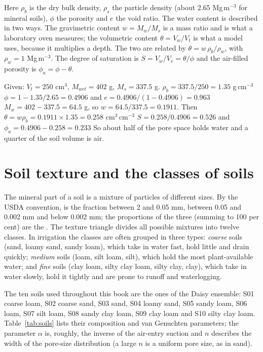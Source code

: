 Here $\rho_b$ is the dry bulk density, $\rho_s$ the particle density (about 2.65 Mg\,m$^{-3}$ for mineral soils), $\phi$ the porosity and $e$ the void ratio. The water content is described in two ways. The gravimetric content $w=M_w/M_s$ is a mass ratio and is what a laboratory oven measures; the volumetric content $\theta=V_w/V_t$ is what a model uses, because it multiplies a depth. The two are related by $\theta=w\,\rho_b/\rho_w$, with $\rho_w=1$ Mg\,m$^{-3}$. The degree of saturation is $S=V_w/V_v=\theta/\phi$ and the air-filled porosity is $\phi_a=\phi-\theta$.

\sol Given: $V_t=250$ cm$^3$, $M_{wet}=402$ g, $M_s=337.5$ g.  $\rho_b=337.5/250=1.35$ g\,cm$^{-3}$ \ans {} $\phi=1-1.35/2.65=0.4906$ and $e=0.4906/(1-0.4906)=0.963$ \ans {} $M_w=402-337.5=64.5$ g, so $w=64.5/337.5=0.1911$. Then $\theta=w\rho_b=0.1911\times1.35=0.258$ cm$^3$\,cm$^{-3}$ \ans {} $S=0.258/0.4906=0.526$ and $\phi_a=0.4906-0.258=0.233$ \ans So about half of the pore space holds water and a quarter of the soil volume is air.

\section{Soil texture and the classes of soils}
The mineral part of a soil is a mixture of particles of different sizes. By the USDA convention,  is the fraction between 2 and 0.05 mm,  between 0.05 and 0.002 mm and  below 0.002 mm; the proportions of the three (summing to 100 per cent) are the . The texture triangle divides all possible mixtures into twelve classes. In irrigation the classes are often grouped in three types: \emph{coarse} soils (sand, loamy sand, sandy loam), which take in water fast, hold little and drain quickly; \emph{medium} soils (loam, silt loam, silt), which hold the most plant-available water; and \emph{fine} soils (clay loam, silty clay loam, silty clay, clay), which take in water slowly, hold it tightly and are prone to runoff and waterlogging.

The ten soils used throughout this book are the ones of the Daisy ensemble: S01 coarse loam, S02 coarse sand, S03 sand, S04 loamy sand, S05 sandy loam, S06 loam, S07 silt loam, S08 sandy clay loam, S09 clay loam and S10 silty clay loam. Table~\ref{tab:soils} lists their composition and van Genuchten parameters; the parameter $\alpha$ is, roughly, the inverse of the air-entry suction and $n$ describes the width of the pore-size distribution (a large $n$ is a uniform pore size, as in sand).

